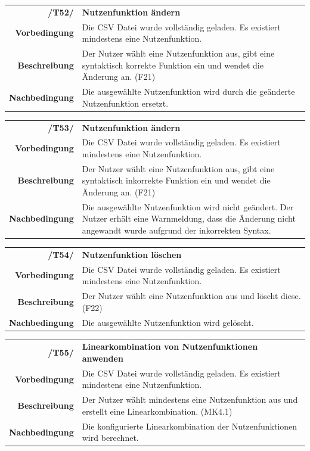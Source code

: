 \documentclass{article}
\begin{document}
\begin{table}[H]
\begin{tabularx}{\textwidth}{rX}
\textbf{/T52/}         & \textbf{Nutzenfunktion ändern} \\
\textbf{Vorbedingung}  & Die CSV Datei wurde vollständig geladen. Es existiert mindestens eine Nutzenfunktion.  \\
\textbf{Beschreibung}  & Der Nutzer wählt eine Nutzenfunktion aus, gibt eine syntaktisch korrekte Funktion ein und wendet die Änderung an. (F21) \\
\textbf{Nachbedingung} & Die ausgewählte Nutzenfunktion wird durch die geänderte Nutzenfunktion ersetzt.
\end{tabularx}
\end{table}

\begin{table}[H]
\begin{tabularx}{\textwidth}{rX}
\textbf{/T53/}         & \textbf{Nutzenfunktion ändern} \\
\textbf{Vorbedingung}  & Die CSV Datei wurde vollständig geladen. Es existiert mindestens eine Nutzenfunktion.   \\
\textbf{Beschreibung}  & Der Nutzer wählt eine Nutzenfunktion aus, gibt eine syntaktisch inkorrekte Funktion ein und wendet die Änderung an. (F21) \\
\textbf{Nachbedingung} & Die ausgewählte Nutzenfunktion wird nicht geändert. Der Nutzer erhält eine Warnmeldung, dass die Änderung nicht angewandt wurde aufgrund der inkorrekten Syntax.
\end{tabularx}
\end{table}

\begin{table}[H]
\begin{tabularx}{\textwidth}{rX}
\textbf{/T54/}         & \textbf{Nutzenfunktion löschen} \\
\textbf{Vorbedingung}  & Die CSV Datei wurde vollständig geladen. Es existiert mindestens eine Nutzenfunktion.  \\
\textbf{Beschreibung}  & Der Nutzer wählt eine Nutzenfunktion aus und löscht diese. (F22) \\
\textbf{Nachbedingung} & Die ausgewählte Nutzenfunktion wird gelöscht.
\end{tabularx}
\end{table}

\begin{table}[H]
\begin{tabularx}{\textwidth}{rX}
\textbf{/T55/}         & \textbf{Linearkombination von Nutzenfunktionen anwenden} \\
\textbf{Vorbedingung}  & Die CSV Datei wurde vollständig geladen. Es existiert mindestens eine Nutzenfunktion.  \\
\textbf{Beschreibung}  & Der Nutzer wählt mindestens eine Nutzenfunktion aus und erstellt eine Linearkombination. (MK4.1) \\
\textbf{Nachbedingung} & Die konfigurierte Linearkombination der Nutzenfunktionen wird berechnet.
\end{tabularx}
\end{table}
\end{document}
